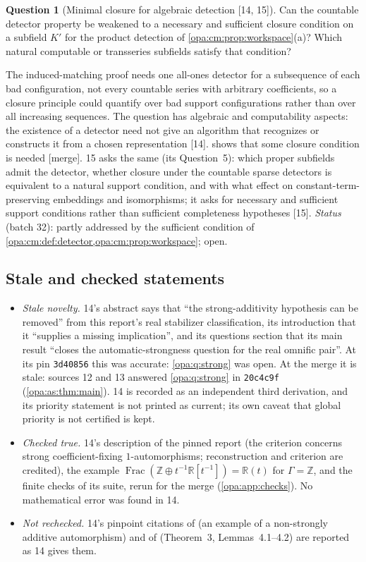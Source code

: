\documentclass[11pt,oneside]{article}
\numberwithin{equation}{section}
\theoremstyle{definition}
\newtheorem{question}[question]{Question}
\theoremstyle{remark}
\newcommand{\R}{\mathbb R}
\newcommand{\Z}{\mathbb Z}
\newcommand{\Frac}{\operatorname{Frac}}
\newcommand{\src}[1]{\textup{\textsf{\small[#1]}}}
\newcommand{\mergetag}{\textup{\textsf{\small[merge]}}}
\begin{document}
\begin{question}[Minimal closure for algebraic detection \src{14, 15}]\label{opa:cm:q:closure}
Can the countable detector property be weakened to a necessary and sufficient closure condition
on a subfield $K'$ for the product detection of \cref{opa:cm:prop:workspace}(a)? Which natural
computable or transseries subfields satisfy that condition?
\end{question}
The induced-matching proof needs one all-ones detector for a subsequence of each bad
configuration, not every countable series with arbitrary coefficients, so a closure principle
could quantify over bad support configurations rather than over all increasing sequences. The
question has algebraic and computability aspects: the existence of a detector need not give an
algorithm that recognizes or constructs it from a chosen representation \src{14}.
 shows that some closure condition is needed \mergetag.
15 asks the same (its Question~5): which proper subfields admit the detector, whether closure
under the countable sparse detectors is equivalent to a natural support condition, and with what
effect on constant-term-preserving embeddings and isomorphisms; it asks for necessary and
sufficient support conditions rather than sufficient completeness hypotheses \src{15}.
\emph{Status} (batch 32): partly addressed by the sufficient condition of
\cref{opa:cm:def:detector,opa:cm:prop:workspace}; open.

\subsection{Stale and checked statements}\label{opa:cm:sub:stale}

\begin{itemize}[itemsep=2pt]
\item \emph{Stale novelty.} 14's abstract says that ``the strong-additivity hypothesis can be
removed'' from this report's real stabilizer classification, its introduction that it
``supplies a missing implication'', and its questions section that its main result ``closes
the automatic-strongness question for the real omnific pair''. At its pin \texttt{3d40856}
this was accurate: \cref{opa:q:strong} was open. At the merge it is stale: sources 12 and 13
answered \cref{opa:q:strong} in \texttt{20c4c9f} (\cref{opa:as:thm:main}). 14 is recorded as an
independent third derivation, and its priority statement is not printed as current; its own
caveat that global priority is not certified is kept.
\item \emph{Checked true.} 14's description of the pinned report (the criterion concerns strong
coefficient-fixing $1$-automorphisms; reconstruction and criterion are credited), the example
$\Frac(\Z\oplus t^{-1}\R[t^{-1}])=\R(t)$ for $\Gamma=\Z$, and the finite checks of its suite, rerun for the
merge (\cref{opa:app:checks}). No mathematical error was found in 14.
\item \emph{Not rechecked.} 14's pinpoint citations of \cite{KS} (an example of a non-strongly
additive automorphism) and of \cite{BCJS} (Theorem~3, Lemmas~4.1--4.2) are reported as 14 gives
them.
\end{itemize}
\end{document}
